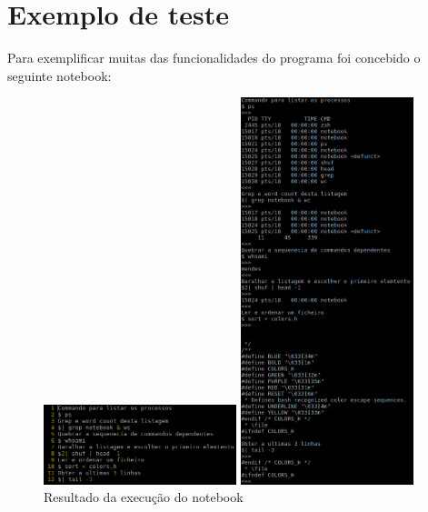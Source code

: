 \documentclass[12pt,a4paper]{report}
\begin{document}
\chapter{Exemplo de teste}
    Para exemplificar muitas das funcionalidades do programa foi concebido o
    seguinte notebook:
        \begin{figure}[h]%
            \centering
            \includegraphics[width=0.5\textwidth]{./images/megaNotebookI.png}

            \includegraphics[width=0.45\textwidth]{./images/megaNotebook.png}
            \caption{Resultado da execução do notebook}
        \end{figure}
\end{document}

